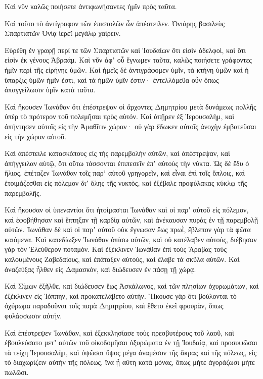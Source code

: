 {Καὶ νῦν καλῶς ποιήσετε ἀντιφωνήσαντες ἡμῖν πρὸς ταῦτα.
\par }{\PP {}Καὶ τοῦτο τὸ ἀντίγραφον τῶν ἐπιστολῶν ὧν ἀπέστειλεν. Ὀνιάρης
βασιλεὺς Σπαρτιατῶν Ὀνίᾳ ἱερεῖ μεγάλῳ χαίρειν.
\par }{\PP {}Εὑρέθη ἐν γραφῇ περί τε τῶν Σπαρτιατῶν καὶ Ἰουδαίων ὅτι εἰσὶν ἀδελφοὶ, καὶ ὅτι εἰσὶν ἐκ γένους Ἁβραάμ.
Καὶ νῦν ἀφʼ οὗ ἔγνωμεν ταῦτα, καλῶς ποιήσετε γράφοντες ἡμῖν περὶ τῆς εἰρήνης ὑμῶν.
Καὶ ἡμεῖς δὲ ἁντιγράφομεν ὑμῖν, τὰ κτήνη ὑμῶν καὶ ἡ ὕπαρξις ὑμῶν ἡμῖν ἐστι, καὶ τὰ ἡμῶν ὑμῖν ἐστιν· ἐντελλόμεθα οὖν ὅπως ἀπαγγείλωσιν ὑμῖν κατὰ ταῦτα.
\par }{\PP {}Καὶ ἤκουσεν Ἰωνάθαν ὅτι ἐπέστρεψαν οἱ ἄρχοντες Δημητρίου μετὰ δυνάμεως πολλῆς ὑπὲρ τὸ πρότερον τοῦ πολεμῆσαι πρὸς αὐτόν.
Καὶ ἀπῇρεν ἐξ Ἱερουσαλὴμ, καὶ ἀπήντησεν αὐτοῖς εἰς τὴν Ἀμαθῖτιν χώραν· οὐ γὰρ ἔδωκεν αὐτοῖς ἀνοχὴν ἐμβατεῦσαι εἰς τὴν χώραν αὐτοῦ.
\par }{\PP {}Καὶ ἀπέστειλε κατασκόπους εἰς τὴς παρεμβολὴν αὐτῶν, καὶ ἀπέστρεψαν, καὶ ἀπήγγειλαν αὐτῷ, ὅτι οὕτω τάσσονται ἐπιπεσεῖν ἐπʼ αὐτοὺς τὴν νύκτα.
Ὡς δὲ ἔδυ ὁ ἥλιος, ἐπέταζεν Ἰωνάθαν τοῖς παρʼ αὐτοῦ γρηγορεῖν, καὶ εἶναι ἐπὶ τοῖς ὅπλοις, καὶ ἑτοιμάζεσθαι εἰς πόλεμον διʼ ὅλης τῆς νυκτὸς, καὶ ἐξέβαλε προφύλακας κύκλῳ τῆς παρεμβολῆς.
\par }{\PP {}Καὶ ἤκουσαν οἱ ὑπεναντίοι ὅτι ἡτοίμασται Ἰωνάθαν καὶ οἱ παρʼ αὐτοῦ εἰς πόλεμον, καὶ ἐφοβήθησαν καὶ ἔπτηξαν τῇ καρδίᾳ αὐτῶν, καὶ ἀνέκαυσαν πυρὰς ἐν τῇ παρεμβολῇ αὐτῶν.
Ἰωνάθαν δὲ καὶ οἱ παρʼ αὐτοῦ οὐκ ἔγνωσαν ἕως πρωῒ, ἔβλεπον γὰρ τὰ φῶτα καιόμενα.
Καὶ κατεδίωξεν Ἰωνάθαν ὀπίσω αὐτῶν, καὶ οὐ κατέλαβεν αὐτούς, διέβησαν γὰρ τὸν Ἐλεύθερον ποταμόν.
Καὶ ἐξέκλινεν Ἰωνάθαν ἐπὶ τοὺς Ἄραβας τοὺς καλουμένους Ζαβεδαίους, καὶ ἐπάταξεν αὐτούς, καὶ ἔλαβε τὰ σκῦλα αὐτῶν.
Καὶ ἀναζεύξας ἦλθεν εἰς Δαμασκόν, καὶ διώδευσεν ἐν πάσῃ τῇ χώρᾳ.
\par }{\PP {}Καὶ Σίμων ἐξῆλθε, καὶ διώδευσεν ἕως Ἀσκάλωνος, καὶ τῶν πλησίων ὀχυρωμάτων, καὶ ἐξέκλινεν εἰς Ἰόππην, καὶ προκατελάβετο αὐτήν.
Ἤκουσε γὰρ ὅτι βούλονται τὸ ὀχύρωμα παραδοῦναι τοῖς παρὰ Δημητρίου, καὶ ἔθετο ἐκεῖ φρουρὰν, ὅπως φυλάσσωσιν αὐτήν.
\par }{\PP {}Καὶ ἐπέστρεψεν Ἰωνάθαν, καὶ ἐξεκκλησίασε τοὺς πρεσβυτέρους τοῦ λαοῦ, καὶ ἐβουλεύσατο μετʼ αὐτῶν τοῦ οἰκοδομῆσαι ὀξυρώματα ἐν τῇ Ἰουδαίᾳ,
καὶ προσυψῶσαι τὰ τείχη Ἱερουσαλὴμ, καὶ ὑψῶσαι ὕψος μέγα ἀναμέσον τῆς ἄκρας καὶ τῆς πόλεως, εἰς τὸ διαχωρίζειν αὐτὴν τῆς πόλεως, ἵνα ᾖ αὕτη κατὰ μόνας, ὅπως μήτε ἀγοράζωσι μήτε πωλῶσι.
}
